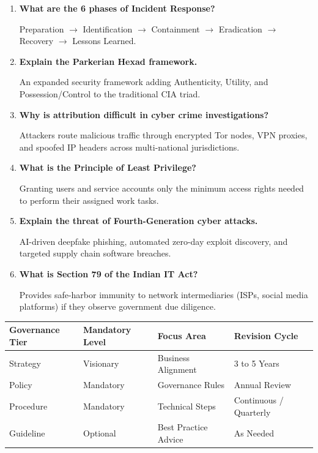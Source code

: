 \documentclass[12pt,a4paper]{article}
\newcommand{\Q}[1]{\textbf{#1}\par\noindent\ignorespaces}
\renewcommand{\arraystretch}{1.45}
\begin{document}
\begin{tcolorbox}[exambox, title={\textbf{Frequently Asked / Viva Questions}}]
\begin{enumerate}[leftmargin=*, label=\textbf{Q\arabic*.}, itemsep=5pt, topsep=0pt]
  \item \Q{What are the 6 phases of Incident Response?}
        Preparation $\to$ Identification $\to$ Containment $\to$ Eradication $\to$ Recovery $\to$ Lessons Learned.

  \item \Q{Explain the Parkerian Hexad framework.}
        An expanded security framework adding Authenticity, Utility, and Possession/Control to the traditional CIA triad.

  \item \Q{Why is attribution difficult in cyber crime investigations?}
        Attackers route malicious traffic through encrypted Tor nodes, VPN proxies, and spoofed IP headers across multi-national jurisdictions.

  \item \Q{What is the Principle of Least Privilege?}
        Granting users and service accounts only the minimum access rights needed to perform their assigned work tasks.

  \item \Q{Explain the threat of Fourth-Generation cyber attacks.}
        AI-driven deepfake phishing, automated zero-day exploit discovery, and targeted supply chain software breaches.

  \item \Q{What is Section 79 of the Indian IT Act?}
        Provides safe-harbor immunity to network intermediaries (ISPs, social media platforms) if they observe government due diligence.
\end{enumerate}
\end{tcolorbox}

\begin{tcolorbox}[tikzbox, title={Summary Comparison: Cyber Security Governance Tiers}]
\centering
{\renewcommand{\arraystretch}{1.45}%
\begin{tabularx}{\linewidth}{|B{2.8cm}|Y|Y|Y|}
\hline
\textbf{Governance Tier} & \textbf{Mandatory Level} & \textbf{Focus Area} & \textbf{Revision Cycle} \\
\hline
Strategy & Visionary & Business Alignment & 3 to 5 Years \\
\hline
Policy & Mandatory & Governance Rules & Annual Review \\
\hline
Procedure & Mandatory & Technical Steps & Continuous / Quarterly \\
\hline
Guideline & Optional & Best Practice Advice & As Needed \\
\hline
\end{tabularx}}
\end{tcolorbox}
\end{document}
